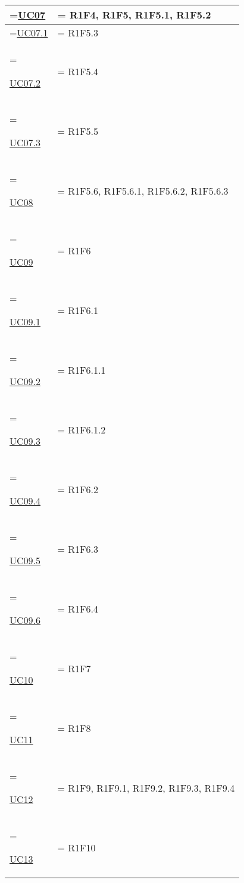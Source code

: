\begin{xltabular}{0.9\textwidth} {
            >{\hsize\linewidth=\hsize}X
            >{\hsize\linewidth=\hsize}X
            }
            \hyperref[UC07]{UC07} &
            R1F4, R1F5, R1F5.1, R1F5.2 \\
            \hline

            \hyperref[UC07.1]{UC07.1} &
            R1F5.3 \\
            \hline

            \hyperref[UC07.2]{UC07.2} &
            R1F5.4 \\
            \hline

            \hyperref[UC07.3]{UC07.3} &
            R1F5.5 \\
            \hline

            \hyperref[UC08]{UC08} &
            R1F5.6, R1F5.6.1, R1F5.6.2, R1F5.6.3 \\
            \hline

            \hyperref[UC09]{UC09} &
            R1F6    \\
            \hline

            \hyperref[UC09.1]{UC09.1} &
            R1F6.1 \\
            \hline

            \hyperref[UC09.2]{UC09.2} &
            R1F6.1.1 \\
            \hline

            \hyperref[UC09.3]{UC09.3} &
            R1F6.1.2 \\
            \hline

            \hyperref[UC09.4]{UC09.4} &
            R1F6.2 \\
            \hline

            \hyperref[UC09.5]{UC09.5} &
            R1F6.3 \\
            \hline

            \hyperref[UC09.6]{UC09.6} &
            R1F6.4 \\
            \hline

            \hyperref[UC10]{UC10} &
            R1F7 \\
            \hline

            \hyperref[UC11]{UC11} &
            R1F8 \\
            \hline

            \hyperref[UC12]{UC12} &
            R1F9, R1F9.1, R1F9.2, R1F9.3, R1F9.4 \\
            \hline

            \hyperref[UC13]{UC13} &
            R1F10 \\
            \hline
            

\end{xltabular}
